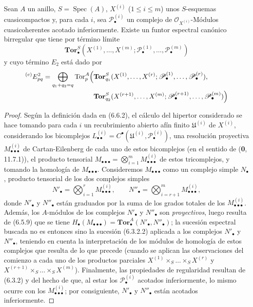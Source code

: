 \begin{corollary}[6.8.3]
Sean $A$ un anillo, $S=\operatorname{Spec}(A)$, $X^{(i)}$
($1\leq i\leq m$) unos $S$-esquemas cuasicompactos y, para cada $i$, sea
$\mathscr P_\bullet^{(i)}$ un complejo de
$\mathscr O_{X^{(i)}}$-Módulos cuasicoherentes acotado inferiormente. Existe
un funtor espectral canónico birregular que tiene por término límite
\[
  \mathbf{Tor}_\bullet^S
  (X^{(1)},\ldots,X^{(m)};
   \mathscr P_\bullet^{(1)},\ldots,\mathscr P_\bullet^{(m)})
\]
y cuyo término $E_2$ está dado por
\[
\begin{split}
  {}^{(e)}E_{pq}^2
  =\bigoplus_{q_1+q_2=q}
  \operatorname{Tor}_p^A\Bigl(
  &\mathbf{Tor}_{q_1}^S
  (X^{(1)},\ldots,X^{(r)};
   \mathscr P_\bullet^{(1)},\ldots,\mathscr P_\bullet^{(r)}),\\
  &\mathbf{Tor}_{q_2}^S
  (X^{(r+1)},\ldots,X^{(m)};
   \mathscr P_\bullet^{(r+1)},\ldots,\mathscr P_\bullet^{(m)})
  \Bigr)
\end{split}
\]
\end{corollary}

\begin{proof}
Según la definición dada en (6.6.2), el cálculo del hipertor considerado se
hace tomando para cada $i$ un recubrimiento abierto afín finito
$\mathfrak U^{(i)}$ de $X^{(i)}$, considerando los bicomplejos
$L_{\bullet\bullet}^{(i)}=C^\bullet(\mathfrak U^{(i)},
\mathscr P_\bullet^{(i)})$, una resolución proyectiva
$M_{\bullet\bullet\bullet}^{(i)}$ de Cartan-Eilenberg de cada uno de estos
bicomplejos (en el sentido de (\textbf{0}, 11.7.1)), el producto tensorial
$M_{\bullet\bullet\bullet}
=\bigotimes_{i=1}^m M_{\bullet\bullet\bullet}^{(i)}$
de estos tricomplejos, y tomando la homología de
$M_{\bullet\bullet\bullet}$. Consideremos $M_{\bullet\bullet\bullet}$ como
un complejo simple $N_\bullet$, producto tensorial de los dos complejos simples
\[
  N'_\bullet=\bigotimes_{i=1}^r M_{\bullet\bullet\bullet}^{(i)},
  \qquad
  N''_\bullet=\bigotimes_{i=r+1}^m M_{\bullet\bullet\bullet}^{(i)},
\]
donde $N'_\bullet$ y $N''_\bullet$ están graduados por la suma de los grados totales
de los $M_{\bullet\bullet\bullet}^{(i)}$. Además, los $A$-módulos de los
complejos $N'_\bullet$ y $N''_\bullet$ son \emph{proyectivos}, luego resulta de
(6.5.9) que se tiene
$H_\bullet(M_{\bullet\bullet\bullet})
=\mathbf{Tor}_\bullet^A(N'_\bullet,N''_\bullet)$;
la sucesión espectral buscada no es entonces sino la sucesión (6.3.2.2)
aplicada a los complejos $N'_\bullet$ y $N''_\bullet$, teniendo en cuenta
la interpretación de los módulos de homología de estos complejos que resulta de lo
que precede (cuando se aplican las observaciones del comienzo a cada uno de los productos
parciales
$X^{(1)}\times_S\ldots\times_S X^{(r)}$ y
$X^{(r+1)}\times_S\ldots\times_S X^{(m)}$). Finalmente, las propiedades de
regularidad resultan de (6.3.2) y del hecho de que, al estar los
$\mathscr P_\bullet^{(i)}$ acotados inferiormente, lo mismo ocurre
con los $M_{\bullet\bullet\bullet}^{(i)}$; por consiguiente, $N'_\bullet$ y
$N''_\bullet$ están acotados inferiormente.
\end{proof}

